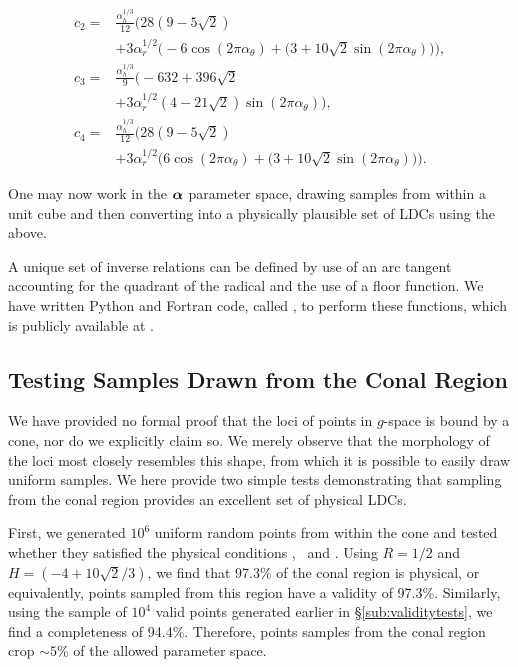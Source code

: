 \begin{align}
c_2 =& \frac{\alpha_h^{1/3}}{12} \Bigg( 28 (9-5\sqrt{2}) \nonumber\\
\qquad& + 3 \alpha_r^{1/2} \Big( -6\cos(2\pi\alpha_{\theta}) 
+ (3+10\sqrt{2}\sin(2\pi\alpha_{\theta}) \Big) \Bigg),\\
c_3 =& \frac{\alpha_h^{1/3}}{9} \Bigg( -632 + 396 \sqrt{2} \nonumber\\
\qquad& + 3\alpha_r^{1/2}(4-21\sqrt{2})\sin(2\pi\alpha_{\theta}) \Bigg) ,\\
c_4 =& \frac{\alpha_h^{1/3}}{12} \Bigg( 28 (9-5\sqrt{2}) \nonumber\\
\qquad& + 3 \alpha_r^{1/2} \Big( 6\cos(2\pi\alpha_{\theta}) 
+ (3+10\sqrt{2}\sin(2\pi\alpha_{\theta}) \Big) \Bigg).
\label{eqn:alpha}
\end{align}

One may now work in the $\boldsymbol{\alpha}$ parameter space, drawing samples from 
within a unit cube and then converting into a physically plausible set of LDCs
using the above.

A unique set of inverse relations can be defined by use of an arc tangent
accounting for the quadrant of the radical and the use of a floor function.
We have written Python and Fortran code, called \LDC, to perform
these functions, which is publicly available at \link.

\subsection{Testing Samples Drawn from the Conal Region}

We have provided no formal proof that the loci of points in $g$-space is bound
by a cone, nor do we explicitly claim so. We merely observe that the morphology 
of the loci most closely resembles this shape, from which it is possible to 
easily draw uniform samples. We here provide two simple tests demonstrating that 
sampling from the conal region provides an excellent set of physical LDCs.

First, we generated $10^6$ uniform random points from within the cone and 
tested whether they satisfied the physical conditions \I, \II\ and \III. 
Using $R=1/2$ and $H=(-4 + 10\sqrt{2}/3)$, we find that 97.3\% of the conal
region is physical, or equivalently, points sampled from this region have a 
validity of 97.3\%. Similarly, using the sample of $10^4$ valid points generated 
earlier in \S\ref{sub:validitytests}, we find a completeness of 94.4\%. 
Therefore, points samples from the conal region crop $\sim5$\% of the allowed 
parameter space.

